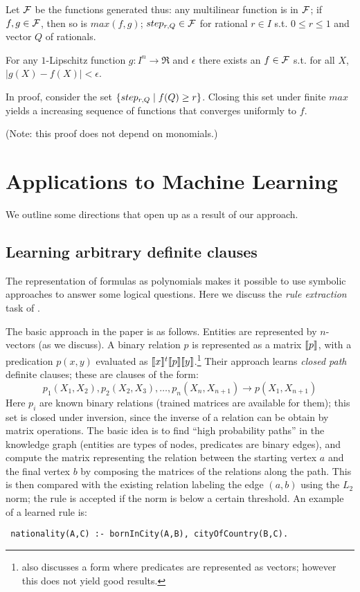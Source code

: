 \documentclass{article} %
\begin{document}
\begin{definition}
  Let \(\cal F\) be the functions generated thus: any multilinear function is in \(\cal F\); if \(f,g \in {\cal F}\), then so is \(max(f,g)\); \(step_{r,Q} \in {\cal F}\) for rational \(r \in I\) s.t. \(0 \leq r \leq 1\) and vector \(Q\) of rationals.
\end{definition}

\begin{theorem}
  For any \(1\)-Lipschitz function \(g:I^n \rightarrow \Re\) and \(\epsilon\) there exists an \(f \in {\cal F}\) s.t. for all \(X\), \(\lvert g(X)-f(X) \rvert \lt \epsilon\).
\end{theorem}
In proof, consider the set \(\{ step_{r,Q} \alt f(Q) \ge r \}\). Closing this set under finite \(max\) yields a increasing sequence of functions that converges uniformly to \(f\).

(Note: this proof does not depend on monomials.)

\section{Applications to Machine Learning}


We outline some directions that open up as a result of our approach.

\subsection{Learning arbitrary definite clauses}
The representation of formulas as polynomials makes it possible to use symbolic approaches to answer some logical questions. Here we discuss the {\em rule extraction} task of \cite[Algorithm 1]{bishan-iclr15}.

The basic approach in the paper is as follows. Entities are represented by $n$-vectors (as we discuss). A binary relation $p$ is represented as a matrix $\llbracket p \rrbracket$, with a predication $p(x,y)$ evaluated as $\llbracket x \rrbracket^t \llbracket p \rrbracket\llbracket y \rrbracket$.\footnote{\cite{bishan-iclr15} also discusses a form where predicates are represented as vectors; however this does not yield good results.} Their approach learns {\em closed path} definite clauses; these are clauses of the form:
$$ p_1(X_1, X_2), p_2(X_2,X_3), \ldots, p_n(X_n, X_{n+1}) \rightarrow p(X_1, X_{n+1})$$
Here $p_i$ are known binary relations (trained matrices are available for them); this set is closed under inversion, since the inverse of a relation can be obtain by matrix operations. The basic idea is to find ``high probability paths'' in the knowledge graph (entities are types of nodes, predicates are binary edges), and compute the matrix representing the relation between the starting vertex $a$ and the final vertex $b$ by composing the matrices of the relations along the path. This is then compared with the existing relation labeling the edge $(a,b)$ using the $L_2$ norm; the rule is accepted if the norm is below a certain threshold. An example of a learned rule is:
\begin{lstlisting}
 nationality(A,C) :- bornInCity(A,B), cityOfCountry(B,C).
\end{lstlisting}
\end{document}
